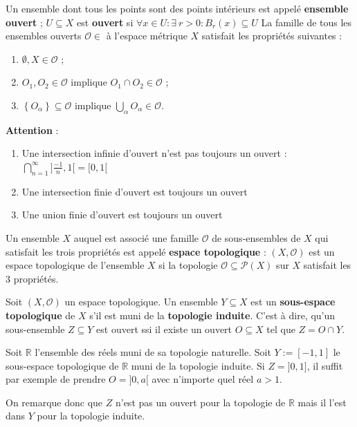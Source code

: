 \begin{definition}
    Un ensemble dont tous les points sont des points intérieurs est appelé \textbf{ensemble ouvert} ; $U \subseteq X$ est \textbf{ouvert} si $\forall x \in U : \exists \ r > 0 : B_r(x) \subseteq U$
    \newpage
    La famille de tous les ensembles ouverts $\mathcal{O} \in$ à l'espace métrique $X$ satisfait les propriétés suivantes :
    \begin{enumerate}[label=(\roman*)]
        \item $\emptyset,X\in \mathcal{O}$ ;
        \item $O_1,O_2\in \mathcal{O}$ implique $O_1\cap O_2 \in \mathcal{O}$ ;
        \item $\left\{ O_\alpha \right\} \subseteq \mathcal{O}$ implique $\bigcup_\alpha O_\alpha \in \mathcal{O}$.
    \end{enumerate}
\end{definition}

\danger \textbf{Attention} :
    \begin{enumerate}[label=(\roman*)]
        \item Une intersection infinie d'ouvert n'est pas toujours un ouvert : $\bigcap \limits^\infty_{n=1}]\frac{-1}{n},1[ = [0,1[$
        \item Une intersection finie d'ouvert est toujours un ouvert
        \item Une union finie d'ouvert est toujours un ouvert
    \end{enumerate}
\vspace{0.3cm}

Un ensemble $X$ auquel est associé une famille $\mathcal{O}$ de sous-ensembles de $X$ qui satisfait les trois propriétés est appelé \textbf{espace topologique} : $(X, \mathcal{O})$ est un espace topologique de l'ensemble $X$ si la topologie $\mathcal{O} \subseteq \mathcal{P}(X)$ sur $X$ satisfait les 3 propriétés.\\

\begin{definition}
    Soit $(X,\mathcal{O})$ un espace topologique. Un ensemble $Y \subseteq X$ est un \textbf{sous-espace topologique} de $X$ s'il est muni de la \textbf{topologie induite}. C'est à dire, qu'un sous-ensemble $Z \subseteq Y$ est ouvert ssi il existe un ouvert $O \subseteq X$ tel que $Z = O \cap Y$.
\end{definition}

\begin{example}
    Soit $\mathbb{R}$ l'ensemble des réels muni de sa topologie naturelle. Soit $Y := [-1,1]$ le sous-espace topologique de $\mathbb{R}$ muni de la topologie induite. Si $Z = ]0,1]$, il suffit par exemple de prendre $O = ]0,a[$ avec n'importe quel réel $a > 1$.
    
    On remarque donc que $Z$ n'est pas un ouvert pour la topologie de $\mathbb{R}$ mais il l'est dans $Y$ pour la topologie induite.
\end{example}


